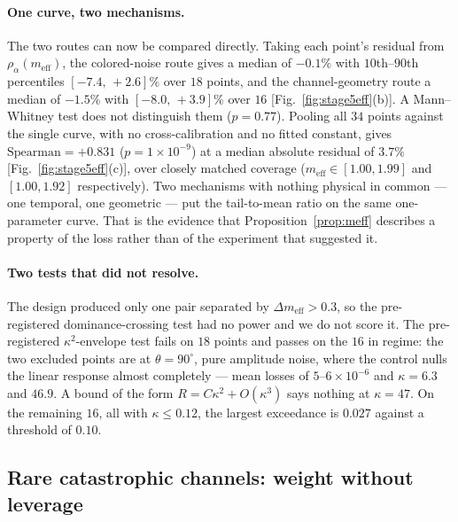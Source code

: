 \documentclass[aps,pra,twocolumn,superscriptaddress,reprint,nofootinbib,floatfix]{revtex4-2}
\theoremstyle{definition}
\begin{document}
\paragraph*{One curve, two mechanisms.} The two routes can now be compared
directly. Taking each point's residual from $\rho_\alpha(m_{\mathrm{eff}})$,
the colored-noise route gives a median of $-0.1\%$ with $10$th--$90$th
percentiles $[-7.4,\,+2.6]\%$ over $18$ points, and the channel-geometry route
a median of $-1.5\%$ with $[-8.0,\,+3.9]\%$ over $16$
[Fig.~\ref{fig:stage5eff}(b)]. A Mann--Whitney test does not distinguish them
($p=0.77$). Pooling all $34$ points against the single curve, with no
cross-calibration and no fitted constant, gives
$\mathrm{Spearman}=+0.831$ ($p=1\times10^{-9}$) at a median absolute residual
of $3.7\%$ [Fig.~\ref{fig:stage5eff}(c)], over closely matched coverage
($m_{\mathrm{eff}}\in[1.00,1.99]$ and $[1.00,1.92]$ respectively). Two
mechanisms with nothing physical in common --- one temporal, one
geometric --- put the tail-to-mean ratio on the same one-parameter curve.
That is the evidence that Proposition~\ref{prop:meff} describes a property of
the loss rather than of the experiment that suggested it.

\paragraph*{Two tests that did not resolve.} The design produced only one
pair separated by $\Delta m_{\mathrm{eff}}>0.3$, so the pre-registered
dominance-crossing test had no power and we do not score it. The pre-registered
$\kappa^2$-envelope test fails on $18$ points and passes on the $16$ in
regime: the two excluded points are at $\theta=90^\circ$, pure amplitude
noise, where the control nulls the linear response almost completely --- mean
losses of $5$--$6\times10^{-6}$ and $\kappa=6.3$ and $46.9$. A bound of the
form $R=C\kappa^2+O(\kappa^3)$ says nothing at $\kappa=47$. On the remaining
$16$, all with $\kappa\le0.12$, the largest exceedance is $0.027$ against a
threshold of $0.10$.

\subsection{Rare catastrophic channels: weight without leverage}
\label{sec:jumps}
\end{document}
